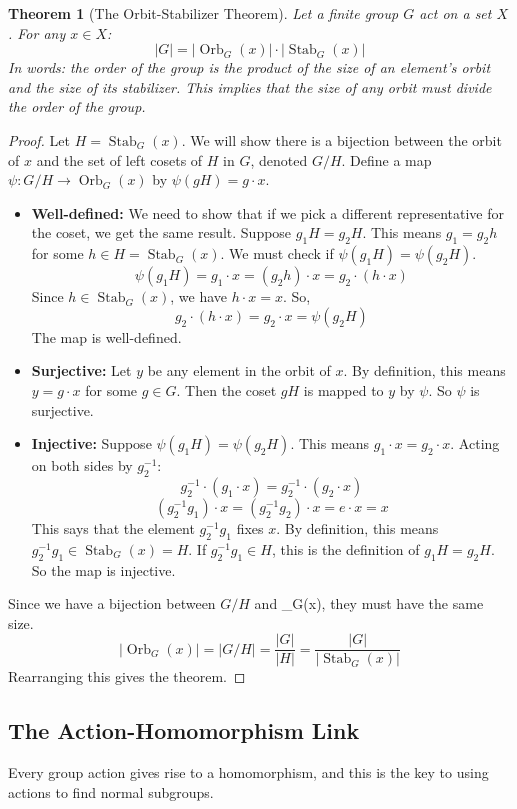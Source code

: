 \documentclass[12pt,a4paper]{article}
\theoremstyle{plain} %
\newtheorem{theorem}{Theorem}[section]
\theoremstyle{definition} %
\theoremstyle{remark} %
\DeclareMathOperator{\Stab}{Stab}
\DeclareMathOperator{\Orb}{Orb}
\begin{document}
\begin{theorem}[The Orbit-Stabilizer Theorem]
Let a finite group $G$ act on a set $X$. For any $x \in X$:
\[
|G| = |\Orb_G(x)| \cdot |\Stab_G(x)|
\]
In words: the order of the group is the product of the size of an element's orbit and the size of its stabilizer. This implies that the size of any orbit must divide the order of the group.
\end{theorem}
\begin{proof}
Let $H = \Stab_G(x)$. We will show there is a bijection between the orbit of $x$ and the set of left cosets of $H$ in $G$, denoted $G/H$.
Define a map $\psi: G/H \to \Orb_G(x)$ by $\psi(gH) = g \cdot x$.
\begin{itemize}
    \item \textbf{Well-defined:} We need to show that if we pick a different representative for the coset, we get the same result. Suppose $g_1H = g_2H$. This means $g_1 = g_2h$ for some $h \in H = \Stab_G(x)$. We must check if $\psi(g_1H) = \psi(g_2H)$.
    \[
    \psi(g_1H) = g_1 \cdot x = (g_2h) \cdot x = g_2 \cdot (h \cdot x)
    \]
    Since $h \in \Stab_G(x)$, we have $h \cdot x = x$. So,
    \[
    g_2 \cdot (h \cdot x) = g_2 \cdot x = \psi(g_2H)
    \]
    The map is well-defined.
    \item \textbf{Surjective:} Let $y$ be any element in the orbit of $x$. By definition, this means $y = g \cdot x$ for some $g \in G$. Then the coset $gH$ is mapped to $y$ by $\psi$. So $\psi$ is surjective.
    \item \textbf{Injective:} Suppose $\psi(g_1H) = \psi(g_2H)$. This means $g_1 \cdot x = g_2 \cdot x$.
    Acting on both sides by $g_2^{-1}$:
    \[
    g_2^{-1} \cdot (g_1 \cdot x) = g_2^{-1} \cdot (g_2 \cdot x)
    \]
    \[
    (g_2^{-1}g_1) \cdot x = (g_2^{-1}g_2) \cdot x = e \cdot x = x
    \]
    This says that the element $g_2^{-1}g_1$ fixes $x$. By definition, this means $g_2^{-1}g_1 \in \Stab_G(x) = H$.
    If $g_2^{-1}g_1 \in H$, this is the definition of $g_1H = g_2H$. So the map is injective.
\end{itemize}Since we have a bijection between $G/H$ and \Orb_G(x), they must have the same size.
\[
|\Orb_G(x)| = |G/H| = \frac{|G|}{|H|} = \frac{|G|}{|\Stab_G(x)|}
\]
Rearranging this gives the theorem.
\end{proof}

\subsection{The Action-Homomorphism Link}
Every group action gives rise to a homomorphism, and this is the key to using actions to find normal subgroups.
\end{document}
